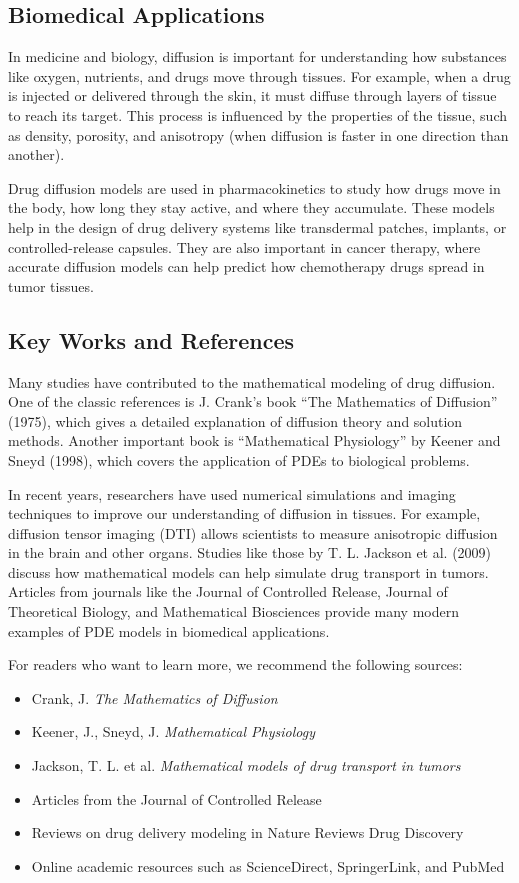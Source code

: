 \documentclass[11pt, a4paper]{article}
\begin{document}
\subsection{Biomedical Applications}
In medicine and biology, diffusion is important for understanding how substances like oxygen, nutrients, and drugs move through tissues.
For example, when a drug is injected or delivered through the skin, it must diffuse through layers of tissue to reach its target.
This process is influenced by the properties of the tissue, such as density, porosity, and anisotropy (when diffusion is faster in one direction than another).

Drug diffusion models are used in pharmacokinetics to study how drugs move in the body, how long they stay active, and where they accumulate.
These models help in the design of drug delivery systems like transdermal patches, implants, or controlled-release capsules.
They are also important in cancer therapy, where accurate diffusion models can help predict how chemotherapy drugs spread in tumor tissues.

\subsection{Key Works and References}
Many studies have contributed to the mathematical modeling of drug diffusion.
One of the classic references is J. Crank’s book “The Mathematics of Diffusion” (1975), which gives a detailed explanation of diffusion theory and solution methods.
Another important book is “Mathematical Physiology” by Keener and Sneyd (1998), which covers the application of PDEs to biological problems.

In recent years, researchers have used numerical simulations and imaging techniques to improve our understanding of diffusion in tissues.
For example, diffusion tensor imaging (DTI) allows scientists to measure anisotropic diffusion in the brain and other organs. Studies like those by T. L. Jackson et al. (2009) discuss how mathematical models can help simulate drug transport in tumors.
Articles from journals like the Journal of Controlled Release, Journal of Theoretical Biology, and Mathematical Biosciences provide many modern examples of PDE models in biomedical applications.

For readers who want to learn more, we recommend the following sources:
\begin{itemize}
  \item Crank, J. \textit{The Mathematics of Diffusion}
  \item Keener, J., Sneyd, J. \textit{Mathematical Physiology}
  \item Jackson, T. L. et al. \textit{Mathematical models of drug transport in tumors}
  \item Articles from the Journal of Controlled Release
  \item Reviews on drug delivery modeling in Nature Reviews Drug Discovery
  \item Online academic resources such as ScienceDirect, SpringerLink, and PubMed
\end{itemize}
\end{document}
